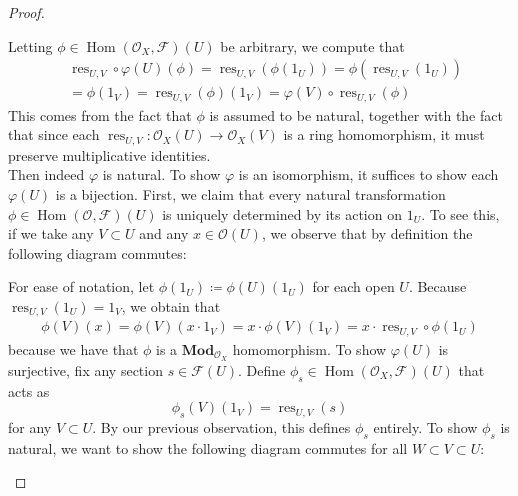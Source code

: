 \documentclass{article}
\newcommand{\fF}{\mathscr{F}}
\newcommand{\fO}{\mathscr{O}}
\newcommand{\Mod}{\mathbf{Mod}} %
\DeclareMathOperator{\res}{\mathrm{res}}
\DeclareMathOperator{\Hom}{\mathrm{Hom}}
\begin{document}
\begin{proof}
\begin{center}
    \end{center}
    Letting $\phi \in \Hom(\fO_X,\fF)(U)$ be arbitrary, we compute that
    \begin{align*}
        &\res_{U,V}\circ \varphi(U)(\phi)=\res_{U,V}(\phi(1_U))=\phi(\res_{U,V}(1_U))\\
        &=\phi(1_V)=\res_{U,V}(\phi)(1_V)=\varphi(V)\circ \res_{U,V}(\phi)
    \end{align*}
    This comes from the fact that $\phi$ is assumed to be natural, together with the fact that since each $\res_{U,V}:\fO_X(U)\to \fO_X(V)$ is a ring homomorphism, it must preserve multiplicative identities.\\
    Then indeed $\varphi$ is natural. To show $\varphi$ is an isomorphism, it suffices to show each $\varphi(U)$ is a bijection. First, we claim that every natural transformation $\phi\in \Hom(\fO,\fF)(U)$ is uniquely determined by its action on $1_U$. To see this, if we take any $V\subset U$ and any $x\in \fO(U)$, we observe that by definition the following diagram commutes:
    \begin{center}
    \end{center}
    For ease of notation, let $\phi(1_U)\coloneqq \phi(U)(1_U)$ for each open $U$. Because $\res_{U,V}(1_U)=1_V$, we obtain that
    \begin{align*}
        \phi(V)(x)=\phi(V)(x\cdot 1_V)=x\cdot \phi(V)(1_V)=x\cdot \res_{U,V}\circ \phi(1_U)
    \end{align*}
    because we have that $\phi$ is a $\Mod_{\fO_X}$ homomorphism. To show $\varphi(U)$ is surjective, fix any section $s\in \fF(U)$. Define $\phi_s\in \Hom(\fO_X,\fF)(U)$ that acts as
    \[
    \phi_s(V)(1_V)=\res_{U,V}(s)
    \]
    for any $V\subset U$. By our previous observation, this defines $\phi_s$ entirely. To show $\phi_s$ is natural, we want to show the following diagram commutes for all $W\subset V\subset U$:
    \begin{center}
        \begin{tikzcd}

\end{tikzcd}
\end{center}
\end{proof}
\end{document}
